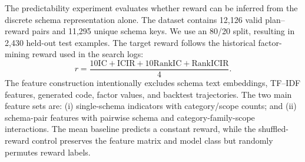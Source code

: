 The predictability experiment evaluates whether reward can be inferred from the discrete schema representation alone. The dataset contains 12,126 valid plan--reward pairs and 11,295 unique schema keys. We use an 80/20 split, resulting in 2,430 held-out test examples. The target reward follows the historical factor-mining reward used in the search logs:
\begin{equation}
r=\frac{10\mathrm{IC}+\mathrm{ICIR}+10\mathrm{RankIC}+\mathrm{RankICIR}}{4}.
\end{equation}
The feature construction intentionally excludes schema text embeddings, TF--IDF features, generated code, factor values, and backtest trajectories. The two main feature sets are: (i) single-schema indicators with category/scope counts; and (ii) schema-pair features with pairwise schema and category-family-scope interactions. The mean baseline predicts a constant reward, while the shuffled-reward control preserves the feature matrix and model class but randomly permutes reward labels.

\begin{table}[t]
\centering
\caption{Full predictability results for schema-space reward prediction. Top10\% lift is measured against random selection.}
\label{tab:appendix_schema_predictability_full}
\setlength\tabcolsep{3pt}
\small
{}
\end{table}

